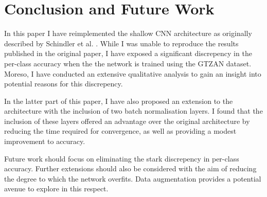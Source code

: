 \documentclass[conference]{IEEEtran}
\begin{document}
\section{Conclusion and Future Work}

In this paper I have reimplemented the shallow CNN architecture as originally described by Schindler et al. \cite{SchindlerLidyRauber}.
While I was unable to reproduce the results published in the original paper, I have exposed a significant discrepency in the per-class accuracy when the the network is trained using the GTZAN dataset.
Moreso, I have conducted an extensive qualitative analysis to gain an insight into potential reasons for this discrepency.

In the latter part of this paper, I have also proposed an extension to the architecture with the inclusion of two batch normalisation layers.
I found that the inclusion of these layers offered an advantage over the original architecture by reducing the time required for convergence, as well as providing a modest improvement to accuracy.

Future work should focus on eliminating the stark discrepency in per-class accuracy.
Further extensions should also be considered with the aim of reducing the degree to which the network overfits.
Data augmentation provides a potential avenue to explore in this respect.



\end{document}
